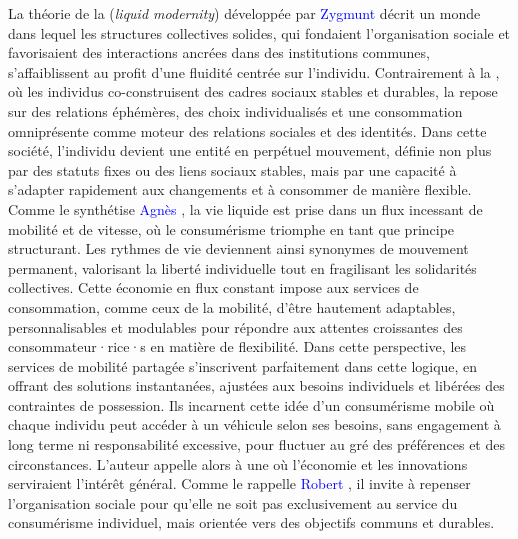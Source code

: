 \begin{refsegment}
{    La théorie de la  (\textsl{liquid modernity}) développée par \textcolor{blue}{Zygmunt} \textcolor{blue}{\textcite[7-28]{bauman_liquid_2000}} décrit un monde dans lequel les structures collectives solides, qui fondaient l’organisation sociale et favorisaient des interactions ancrées dans des institutions communes, s'affaiblissent au profit d'une fluidité centrée sur l’individu. Contrairement à la , où les individus co-construisent des cadres sociaux stables et durables, la  repose sur des relations éphémères, des choix individualisés et une consommation omniprésente comme moteur des relations sociales et des identités. Dans cette société, l’individu devient une entité en perpétuel mouvement, définie non plus par des statuts fixes ou des liens sociaux stables, mais par une capacité à s’adapter rapidement aux changements et à consommer de manière flexible. Comme le synthétise \textcolor{blue}{Agnès} \textcolor{blue}{\textcite[2]{falabregues_bauman_2014}}, la vie liquide est prise dans un flux incessant de mobilité et de vitesse, où le consumérisme triomphe en tant que principe structurant. Les rythmes de vie deviennent ainsi synonymes de mouvement permanent, valorisant la liberté individuelle tout en fragilisant les solidarités collectives. Cette économie en flux constant impose aux services de consommation, comme ceux de la mobilité, d’être hautement adaptables, personnalisables et modulables pour répondre aux attentes croissantes des consommateur·rice·s en matière de flexibilité. Dans cette perspective, les services de mobilité partagée s’inscrivent parfaitement dans cette logique, en offrant des solutions instantanées, ajustées aux besoins individuels et libérées des contraintes de possession. Ils incarnent cette idée d’un consumérisme mobile où chaque individu peut accéder à un véhicule selon ses besoins, sans engagement à long terme ni responsabilité excessive, pour fluctuer au gré des préférences et des circonstances. L'auteur appelle alors à une  où l’économie et les innovations serviraient l’intérêt général. Comme le rappelle \textcolor{blue}{Robert} \textcolor{blue}{\textcite{maggiori_zygmunt_2017}}, il invite à repenser l’organisation sociale pour qu’elle ne soit pas exclusivement au service du consumérisme individuel, mais orientée vers des objectifs communs et durables.
}
\end{refsegment}
